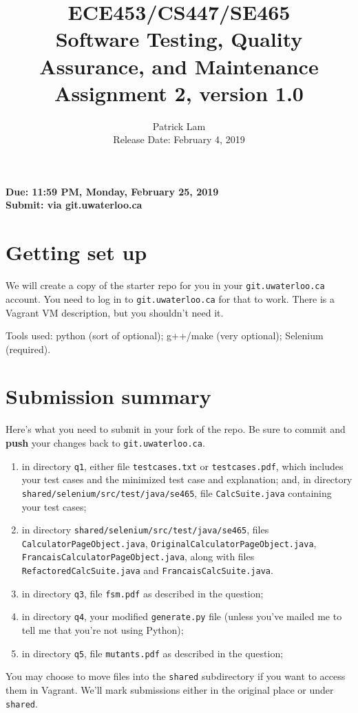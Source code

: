 \documentclass[10pt,hidelinks]{article}
\begin{document}
\title{
ECE453/CS447/SE465 \\
Software Testing, Quality Assurance, and Maintenance\\
Assignment 2, version 1.0}
\author{Patrick Lam \\
{Release Date:  February 4, 2019} \\
}
\renewcommand{\today}{}
\maketitle

\begin{center}

{\bf Due:  11:59 PM, Monday, February 25, 2019} \\
{\bf Submit: via git.uwaterloo.ca }\\
\end{center}

\section*{Getting set up}
We will create a copy of the starter repo for you in your {\tt git.uwaterloo.ca} account. You need to log in to {\tt git.uwaterloo.ca} for that to work. There is a Vagrant VM description,
but you shouldn't need it.

Tools used: python (sort of optional); g++/make (very optional); Selenium (required).

\section*{Submission summary}
Here's what you need to submit in your fork of the repo. Be sure to commit
and {\bf push} your changes back to {\tt git.uwaterloo.ca}.
\begin{enumerate}
\item in directory {\tt q1}, either file {\tt testcases.txt} or {\tt testcases.pdf}, which includes your test cases and the minimized test case and explanation; and, in directory {\tt shared/selenium/src/test/java/se465}, file {\tt CalcSuite.java} containing your test cases;
\item in directory {\tt shared/selenium/src/test/java/se465}, files {\tt CalculatorPageObject.java}, {\tt OriginalCalculatorPageObject.java}, {\tt FrancaisCalculatorPageObject.java}, along with files {\tt RefactoredCalcSuite.java} and {\tt FrancaisCalcSuite.java}.
\item in directory {\tt q3}, file {\tt fsm.pdf} as described in the question;
\item in directory {\tt q4}, your modified {\tt generate.py} file (unless you've mailed me to tell me that you're not using Python);
\item in directory {\tt q5}, file {\tt mutants.pdf} as described in the question;
\end{enumerate}
You may choose to move files into the {\tt shared} subdirectory if you want to access them in Vagrant. We'll mark submissions either in the original place or under {\tt shared}.
 
\end{document}
